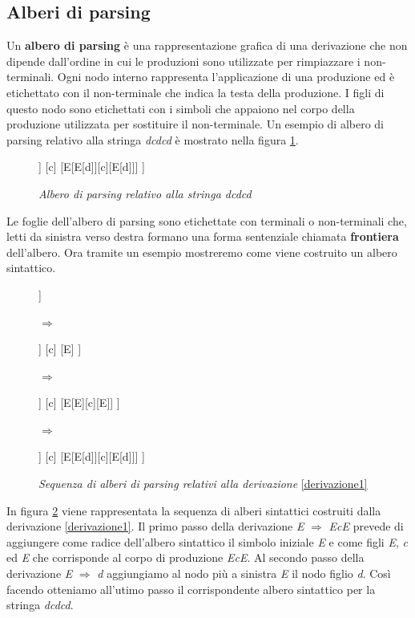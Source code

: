 \subsection{Alberi di parsing}
Un \textbf{albero di parsing} è \cite{libro: compilatori} una rappresentazione grafica di una derivazione che non dipende dall'ordine in cui le produzioni sono utilizzate per rimpiazzare i non-terminali. Ogni nodo interno rappresenta l'applicazione di una produzione ed è etichettato con il non-terminale che indica la testa della  produzione. I figli di questo nodo sono etichettati con i simboli che appaiono nel corpo della produzione utilizzata per sostituire il non-terminale. Un esempio di albero di parsing relativo alla stringa \textit{dcdcd} è mostrato nella figura \ref{fig:albero}.\par 
\begin{figure}[hbpb]
	\centering
	\begin{forest}
		[E
		[E[d]]
		[c]
		[E[E[d]][c][E[d]]]
		]
	\end{forest}
	\caption{\textit{Albero di parsing relativo alla stringa dcdcd} }\label{fig:albero}
\end{figure}
\noindent Le foglie dell'albero di parsing sono etichettate con terminali o non-terminali che, letti da sinistra verso destra formano una forma sentenziale chiamata \textbf{frontiera} dell'albero. Ora tramite un esempio mostreremo come viene costruito un albero sintattico. \par
\begin{figure}[hbpb]
	\centering
	\begin{forest}
		[E
		[E]
		[c]
		[E]
		]
	\end{forest}
	$\Rightarrow$    
	\begin{forest}
		[E
		[E[d]]
		[c]
		[E]
		]
	\end{forest}
	$\Rightarrow$    
	\begin{forest}
		[E
		[E[d]]
		[c]
		[E[E][c][E]]
		]	
	\end{forest}
	$\Rightarrow$    
	\begin{forest}
		[E
		[E[d]]
		[c]
		[E[E[d]][c][E[d]]]
		]
	\end{forest}
	\caption{\textit{Sequenza di alberi di parsing relativi alla derivazione }\ref{derivazione1}}\label{fig:passiAlbero}
\end{figure}
\noindent In figura \ref{fig:passiAlbero} viene rappresentata la sequenza di alberi sintattici costruiti dalla derivazione \ref{derivazione1}. Il primo passo della derivazione \textit{E} $\Rightarrow$ \textit{EcE} prevede di aggiungere come radice dell'albero sintattico il simbolo iniziale \textit{E} e come figli \textit{E}, \textit{c} ed \textit{E} che corrisponde al corpo di produzione \textit{EcE}. Al secondo passo della derivazione \textit{E} $\Rightarrow$ \textit{d} aggiungiamo al nodo più a sinistra \textit{E} il nodo figlio \textit{d}. Così facendo otteniamo all'utimo passo il corrispondente albero sintattico per la stringa \textit{dcdcd}.
